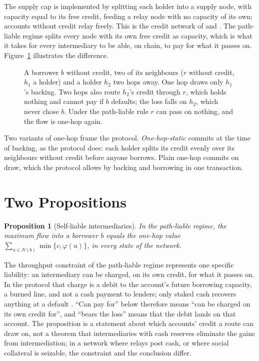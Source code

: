 \documentclass[11pt]{article}
\theoremstyle{plain}
\newtheorem{proposition}{Proposition}
\theoremstyle{definition}
\begin{document}
The supply cap is implemented by splitting each holder into a supply node, with capacity equal to its
free credit, feeding a relay node with no capacity of its own; accounts without credit relay freely.
This is the credit network of \citet{karlan2009trust} and \citet{dandekar2011liquidity}. The
path-liable regime splits every node with its own free credit as capacity, which is what it takes for
every intermediary to be able, on chain, to pay for what it passes on. Figure~\ref{fig:regimes}
illustrates the difference.

\begin{figure}[ht]
  \centering
  
  \caption{A borrower $b$ without credit, two of its neighbours ($r$ without credit, $h_1$ a holder) and
  a holder $h_2$ two hops away. One hop draws only $h_1$'s backing. Two hops also route $h_2$'s credit
  through $r$, which holds nothing and cannot pay if $b$ defaults; the loss falls on $h_2$, which
  never chose $b$. Under the path-liable rule $r$ can pass on nothing, and the flow is one-hop again.}
  \label{fig:regimes}
\end{figure}

Two variants of one-hop frame the protocol. \emph{One-hop-static} commits at the time of backing, as
the protocol does: each holder splits its credit evenly over its neighbours without credit before
anyone borrows. Plain one-hop commits on draw, which the protocol allows by backing and borrowing in
one transaction.

\section{Two Propositions}\label{sec:props}

\begin{proposition}[Self-liable intermediaries]\label{prop:pathliable}
In the path-liable regime, the maximum flow into a borrower $b$ equals the one-hop value
$\sum_{u\in N(b)}\min\{c,\varphi(u)\}$, in every state of the network.
\end{proposition}

The throughput constraint of the path-liable regime represents one specific liability: an
intermediary can be charged, on its own credit, for what it passes on. In the protocol that
charge is a debit to the account's future borrowing capacity, a burned line, and not a cash
payment to lenders; only staked cash recovers anything at a default
\citep{conservedcredit2026}. ``Can pay for'' below therefore means ``can be charged on its own
credit for'', and ``bears the loss'' means that the debit lands on that account. The proposition is
a statement about which accounts' credit a route can draw on, not a theorem that intermediaries
with cash reserves eliminate the gains from intermediation; in a network where relays post cash,
or where social collateral is seizable, the constraint and the conclusion differ.
\end{document}

